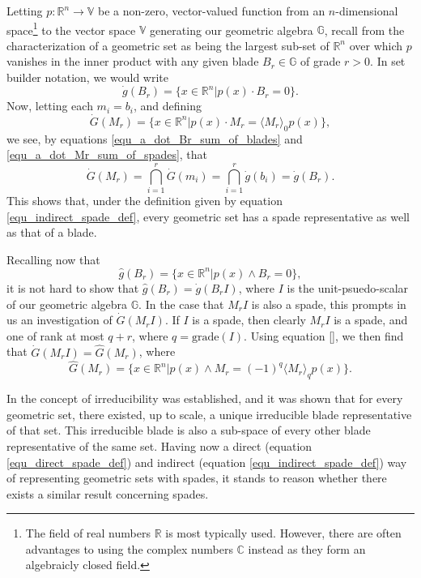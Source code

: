 \documentclass{birkjour}
\theoremstyle{definition}
\theoremstyle{remark}
\numberwithin{equation}{section}
\newcommand{\R}{\mathbb{R}}
\newcommand{\C}{\mathbb{C}}
\newcommand{\G}{\mathbb{G}}
\newcommand{\V}{\mathbb{V}}
\newcommand{\gd}{\dot{g}}
\newcommand{\gh}{\hat{g}}
\newcommand{\Gd}{\dot{G}}
\newcommand{\Gh}{\hat{G}}
\newcommand{\grade}{\mbox{grade}}
\begin{document}
Letting $p:\R^n\to\V$ be a non-zero, vector-valued function from an $n$-dimensional space\footnote{The field of real numbers $\R$ is most typically used.
However, there are often advantages to using the complex numbers $\C$ instead as they form an algebraicly closed field.} to the vector
space $\V$ generating our geometric algebra $\G$, recall from \cite{Parkin15} the characterization of a geometric set as being the largest sub-set of $\R^n$
over which $p$ vanishes in the inner product with any given blade $B_r\in\G$ of grade $r>0$.  In set builder notation, we would write
\begin{equation*}\label{equ_indirect_blade_def}
\gd(B_r) = \{x\in\R^n|p(x)\cdot B_r=0\}.
\end{equation*}
Now, letting each $m_i=b_i$, and defining
\begin{equation}\label{equ_indirect_spade_def}
\Gd(M_r) = \{x\in\R^n|p(x)\cdot M_r=\langle M_r\rangle_0p(x)\},
\end{equation}
we see, by equations \eqref{equ_a_dot_Br_sum_of_blades} and \eqref{equ_a_dot_Mr_sum_of_spades}, that
\begin{equation*}\label{equ_direct_blade_def}
\Gd(M_r) = \bigcap_{i=1}^r\Gd(m_i) = \bigcap_{i=1}^r\gd(b_i) = \gd(B_r).
\end{equation*}
This shows that, under the definition given by equation \eqref{equ_indirect_spade_def}, every geometric set has a spade representative as well as that of a blade.

Recalling now that
\begin{equation}\label{equ_direct_blade_def}
\gh(B_r) = \{x\in\R^n|p(x)\wedge B_r=0\},
\end{equation}
it is not hard to show that $\gh(B_r)=\gd(B_rI)$,
where $I$ is the unit-psuedo-scalar of our geometric algebra $\G$.
In the case that $M_rI$ is also a spade, this prompts in us an investigation of $\Gd(M_rI)$.
If $I$ is a spade, then clearly $M_rI$ is a spade, and one of rank at most $q+r$, where $q=\grade(I)$.
Using equation \eqref{}, we then find that $\Gd(M_rI)=\Gh(M_r)$, where
\begin{equation}\label{equ_direct_spade_def}
\Gh(M_r) = \{x\in\R^n|p(x)\wedge M_r=(-1)^q\langle M_r\rangle_q p(x)\}.
\end{equation}

In \cite{Parkin15} the concept of irreducibility was established, and it was shown that for every
geometric set, there existed, up to scale, a unique irreducible blade representative of that set.
This irreducible blade is also a sub-space of every other blade representative of the same set.
Having now a direct (equation \eqref{equ_direct_spade_def}) and indirect (equation \eqref{equ_indirect_spade_def}) way of representing geometric sets with spades,
it stands to reason whether there exists a similar result concerning spades.
\end{document}
